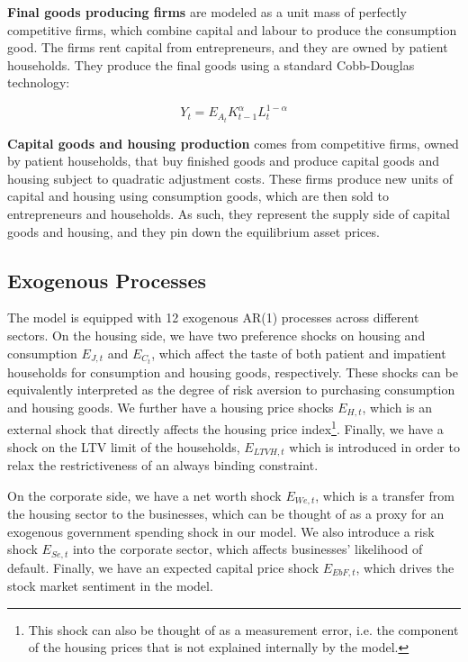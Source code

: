 \documentclass[12pt]{article}
\numberwithin{equation}{section}
\begin{document}
\textbf{Final goods producing firms} are modeled as a unit mass of perfectly competitive firms, which combine capital and labour to produce the consumption good. The firms rent capital from entrepreneurs, and they are owned by patient households. They produce the final goods using a standard Cobb-Douglas technology: 

\begin{equation}
Y_{t}=E_{A_{t}} K^{\alpha}_{t-1}L^{1-\alpha}_{t}
\end{equation}

\textbf{Capital goods and housing production} comes from competitive firms, owned by patient households,  that buy finished goods and produce capital goods and housing subject to quadratic adjustment costs. These firms produce new units of capital and housing using consumption goods, which are then sold to entrepreneurs and households. As such, they represent the supply side of capital goods and housing, and they pin down the equilibrium asset prices. 

\subsection{Exogenous Processes}

The model is equipped with 12 exogenous AR(1) processes across different sectors. On the housing side, we have two preference shocks on housing and consumption $E_{J,t}$ and $E_{C_t}$, which affect the taste of both patient and impatient households for consumption and housing goods, respectively. These shocks can be equivalently interpreted as the degree of risk aversion to purchasing consumption and housing goods. We further have a housing price shocks $E_{H,t}$, which is an external shock that directly affects the housing price index\footnote{This shock can also be thought of as a measurement error, i.e. the component of the housing prices that is not explained internally by the model.}. Finally, we have a shock on the LTV limit of the households, $E_{LTVH,t}$ which is introduced in order to relax the restrictiveness of an always binding constraint. 

On the corporate side, we have a net worth shock $E_{We,t}$, which is a transfer from the housing sector to the businesses, which can be thought of as a proxy for an exogenous government spending shock in our model. We also introduce a risk shock $E_{Se,t}$ into the corporate sector, which affects businesses' likelihood of default. Finally, we have an expected capital price shock $E_{EbF,t}$, which drives the stock market sentiment in the model. 
\end{document}
